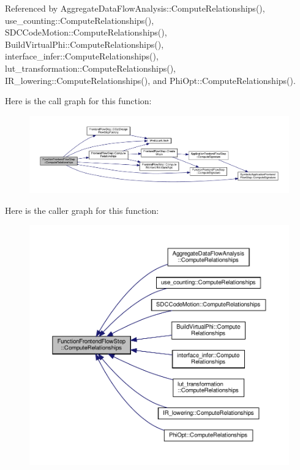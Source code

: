 Referenced by Aggregate\+Data\+Flow\+Analysis\+::\+Compute\+Relationships(), use\+\_\+counting\+::\+Compute\+Relationships(), S\+D\+C\+Code\+Motion\+::\+Compute\+Relationships(), Build\+Virtual\+Phi\+::\+Compute\+Relationships(), interface\+\_\+infer\+::\+Compute\+Relationships(), lut\+\_\+transformation\+::\+Compute\+Relationships(), I\+R\+\_\+lowering\+::\+Compute\+Relationships(), and Phi\+Opt\+::\+Compute\+Relationships().

Here is the call graph for this function\+:
\nopagebreak
\begin{figure}[H]
\begin{center}
\leavevmode
\includegraphics[width=350pt]{d8/d0a/classFunctionFrontendFlowStep_a1a815ea7885f3e92e414dadd40c43cba_cgraph}
\end{center}
\end{figure}
Here is the caller graph for this function\+:
\nopagebreak
\begin{figure}[H]
\begin{center}
\leavevmode
\includegraphics[width=350pt]{d8/d0a/classFunctionFrontendFlowStep_a1a815ea7885f3e92e414dadd40c43cba_icgraph}
\end{center}
\end{figure}
\mbox{\label{classFunctionFrontendFlowStep_afb307a4196545afa53ce35c7e4955de7}} 
